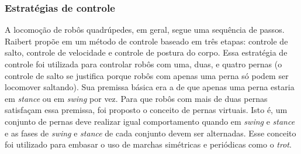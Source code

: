 \documentclass[conference]{IEEEtran}
\begin{document}


\subsubsection{Estratégias de controle}
A locomoção de robôs quadrúpedes, em geral, segue uma sequência de passos. Raibert propõe em \cite{Raibert1986} um método de controle baseado em três etapas: controle de salto, controle de velocidade e controle de postura do corpo. Essa estratégia de controle foi utilizada para controlar robôs com uma, duas, e quatro pernas (o controle de salto se justifica porque robôs com apenas uma perna só podem ser locomover saltando). Sua premissa básica era a de que apenas uma perna estaria em \textit{stance} ou em \textit{swing} por vez. Para que robôs com mais de duas pernas satisfaçam essa premissa, foi proposto o conceito de pernas virtuais. Isto é, um conjunto de pernas deve realizar igual comportamento quando em \textit{swing} e \textit{stance} e as fases de \textit{swing} e \textit{stance} de cada conjunto devem ser alternadas. Esse conceito foi utilizado para embasar o uso de marchas simétricas e periódicas como o \textit{trot}.
\end{document}
